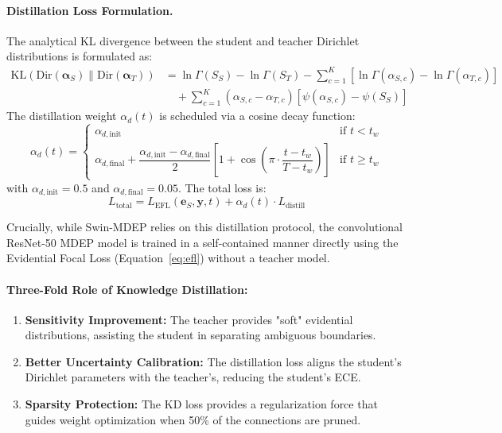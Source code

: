 \documentclass[11pt, a4paper]{article}
\newcommand{\Dir}{\text{Dir}}
\newcommand{\KL}{\text{KL}}
\begin{document}
\paragraph{Distillation Loss Formulation.}
The analytical KL divergence between the student and teacher Dirichlet distributions is formulated as:
\begin{align}
    \KL(\Dir(\bm{\alpha}_S) \| \Dir(\bm{\alpha}_T)) &= \ln\Gamma(S_S) - \ln\Gamma(S_T) - \sum_{c=1}^K \left[\ln\Gamma(\alpha_{S,c}) - \ln\Gamma(\alpha_{T,c})\right] \nonumber \\
    &\quad + \sum_{c=1}^K (\alpha_{S,c} - \alpha_{T,c})\left[\psi(\alpha_{S,c}) - \psi(S_S)\right] \label{eq:dir_kl_full}
\end{align}
The distillation weight $\alpha_d(t)$ is scheduled via a cosine decay function:
\begin{equation}\label{eq:alpha_d}
    \alpha_d(t) = \begin{cases}
        \alpha_{d,\text{init}} & \text{if } t < t_w \\[6pt]
        \alpha_{d,\text{final}} + \dfrac{\alpha_{d,\text{init}} - \alpha_{d,\text{final}}}{2}\left[1 + \cos\!\left(\pi \cdot \dfrac{t - t_w}{T - t_w}\right)\right] & \text{if } t \ge t_w
    \end{cases}
\end{equation}
with $\alpha_{d,\text{init}} = 0.5$ and $\alpha_{d,\text{final}} = 0.05$. The total loss is:
\begin{equation}\label{eq:total_loss}
    L_{\text{total}} = L_{\text{EFL}}(\bm{e}_S, \bm{y}, t) + \alpha_d(t) \cdot L_{\text{distill}}
\end{equation}

Crucially, while Swin-MDEP relies on this distillation protocol, the convolutional ResNet-50 MDEP model is trained in a self-contained manner directly using the Evidential Focal Loss (Equation~\ref{eq:efl}) without a teacher model.

\paragraph{Three-Fold Role of Knowledge Distillation:}
\begin{enumerate}
    \item \textbf{Sensitivity Improvement:} The teacher provides "soft" evidential distributions, assisting the student in separating ambiguous boundaries.
    \item \textbf{Better Uncertainty Calibration:} The distillation loss aligns the student's Dirichlet parameters with the teacher's, reducing the student's ECE.
    \item \textbf{Sparsity Protection:} The KD loss provides a regularization force that guides weight optimization when 50\% of the connections are pruned.
\end{enumerate}
\end{document}
